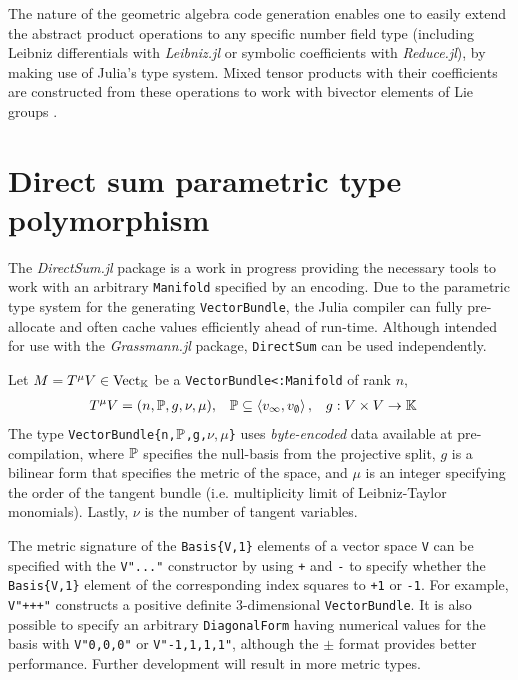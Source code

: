 \documentclass{juliacon}
\begin{document}
The nature of the geometric algebra code generation enables one to easily extend the abstract product operations to any specific number field type (including Leibniz differentials with \textit{Leibniz.jl} or symbolic coefficients with \textit{Reduce.jl}), by making use of Julia's type system. Mixed tensor products with their coefficients are constructed from these operations to work with bivector elements of Lie groups \cite{hestenes}\cite{shahshahani}.

\section{Direct sum parametric type polymorphism}

The \textit{DirectSum.jl} package is a work in progress providing the necessary tools to work with an arbitrary \verb`Manifold` specified by an encoding. Due to the parametric type system for the generating \verb`VectorBundle`, the Julia compiler can fully pre-allocate and often cache values efficiently ahead of run-time.
Although intended for use with the \textit{Grassmann.jl} package, \verb`DirectSum` can be used independently.

\begin{definition}
	Let $M = T^\mu V\in\text{Vect}_{\mathbb{K}}$ be a \verb`VectorBundle<:Manifold` of rank $n$,
	\begin{align*}
		T^\mu V &= (n,\mathbb{P},g,\nu,\mu), & \mathbb{P} &\subseteq\left\langle v_\infty,v_\emptyset \right\rangle, & g &:V\times V\rightarrow\mathbb{K}
	\end{align*}
	The type \verb+VectorBundle{n,+$\mathbb{P}$\verb+,g,+$\nu,\mu$\verb+}+ uses \textit{byte-encoded} data available at pre-compilation, where
	$\mathbb{P}$ specifies the null-basis from the projective split,
	$g$ is a bilinear form that specifies the metric of the space,
	and $\mu$ is an integer specifying the order of the tangent bundle (i.e. multiplicity limit of Leibniz-Taylor monomials). Lastly, $\nu$ is the number of tangent variables.
\end{definition}
	The metric signature of the \verb+Basis{V,1}+ elements of a vector space \verb+V+ can be specified with the \verb+V"..."+ constructor by using \verb-+- and \verb+-+ to specify whether the \verb+Basis{V,1}+ element of the corresponding index squares to \verb`+1` or \verb`-1`.
	For example, \verb`V"+++"` constructs a positive definite 3-dimensional \verb`VectorBundle`.
	It is also possible to specify an arbitrary \verb`DiagonalForm` having numerical values for the basis with \verb`V"0,0,0"` or \verb`V"-1,1,1,1"`, although the $\pm$ format provides better performance.
	Further development will result in more metric types.
\end{document}
